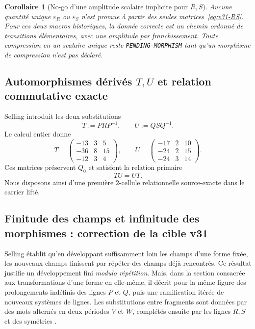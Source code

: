 \documentclass[11pt,a4paper]{article}
\newtheorem{corollary}[theorem]{Corollaire}
\newcommand{\certPending}{\texttt{PENDING-MORPHISM}}
\begin{document}
\begin{corollary}[No-go d'une amplitude scalaire implicite pour $R,S$]\label{cor:v31-RS-epsilon-nogo}
Aucune quantité unique $\varepsilon_R$ ou $\varepsilon_S$ n'est promue à partir des seules
matrices~\eqref{eq:v31-RS}. Pour ces deux macros historiques, la donnée correcte est un chemin
ordonné de transitions élémentaires, avec une amplitude par franchissement. Toute compression en
un scalaire unique reste \certPending{} tant qu'un morphisme de compression n'est pas déclaré.
\end{corollary}

\subsection{Automorphismes dérivés \texorpdfstring{$T,U$}{T,U} et relation commutative exacte}

Selling introduit les deux substitutions
\begin{equation}\label{eq:v31-TU-def}
 T:=PRP^{-1},
 \qquad
 U:=QSQ^{-1}.
\end{equation}
Le calcul entier donne
\begin{equation}\label{eq:v31-TU}
 \boxed{
 T=
 \begin{pmatrix}
 -13&3&5\\
 -36&8&15\\
 -12&3&4
 \end{pmatrix},
 \qquad
 U=
 \begin{pmatrix}
 -17&2&10\\
 -24&2&15\\
 -24&3&14
 \end{pmatrix}.}
\end{equation}
Ces matrices préservent $Q_0$ et satisfont la relation primaire
\begin{equation}\label{eq:v31-TU-commute}
 \boxed{TU=UT.}
\end{equation}
Nous disposons ainsi d'une première $2$-cellule relationnelle source-exacte dans le carrier lifté.

\subsection{Finitude des champs et infinitude des morphismes : correction de la cible v31}

Selling établit qu'en développant suffisamment loin les champs d'une forme fixée, les nouveaux
champs finissent par répéter des champs déjà rencontrés. Ce résultat justifie un développement
fini \emph{modulo répétition}. Mais, dans la section consacrée aux transformations d'une forme en
elle-même, il décrit pour la même figure des prolongements indéfinis des lignes $P$ et $Q$, puis
une ramification itérée de nouveaux systèmes de lignes. Les substitutions entre fragments sont
données par des mots alternés en deux périodes $V$ et $W$, complétés ensuite par les lignes
$R,S$ et des symétries \cite{Selling1877}.
\end{document}
